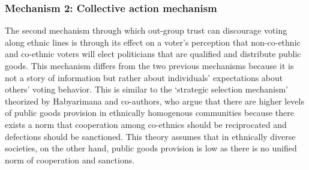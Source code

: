 \documentclass[a4paper, 12pt]{article}
\begin{document}
\subsubsection{Mechanism 2: Collective action mechanism}
The second mechanism through which out-group trust can discourage voting along ethnic lines is through its effect on a voter’s perception that non-co-ethnic and co-ethnic voters will elect politicians that are qualified and distribute public goods. This mechanism differs from the two previous mechanisms because it is not a story of information but rather about individuals’ expectations about others’ voting behavior. This is similar to the ‘strategic selection mechanism’ theorized by Habyarimana and co-authors\cite{habyarimanaWhyDoesEthnic2007}, who argue that there are higher levels of public goods provision in ethnically homogenous communities because there exists a norm that cooperation among co-ethnics should be reciprocated and defections should be sanctioned. This theory assumes that in ethnically diverse societies, on the other hand, public goods provision is low as there is no unified norm of cooperation and sanctions.
\end{document}
